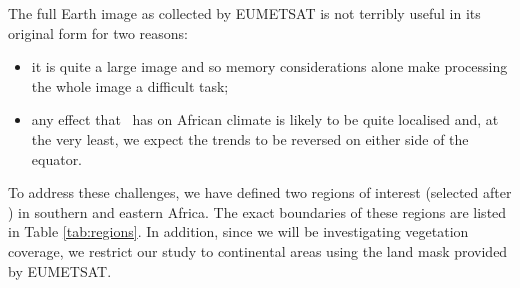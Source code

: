 \begin{table}
  \centering
  \caption{The coordinates that define our regions of interest. Top
    (Left) and Bottom (Right) correspond to the most northern
    (eastern) and southern (western) latitudes (longitudes) of the
    boxes defining the regions, respectively. All values in decimal
    degrees.}
  \label{tab:regions}
\end{table}

The full Earth image as collected by EUMETSAT is not terribly useful
in its original form for two reasons:
\begin{itemize}
  \item{it is quite a large
    image and so memory considerations alone make processing the whole
    image a difficult task;}
  \item{any effect that \elnino\ has on African climate is likely to be
    quite localised and, at the very least, we expect the trends to be
    reversed on either side of the equator.}
\end{itemize}
To address these challenges, we have defined two regions of interest
(selected after \cite{anyamba1996, anyamba2002}) in southern and
eastern Africa. The exact boundaries of these regions are listed in
Table \ref{tab:regions}. In addition, since we will be investigating
vegetation coverage, we restrict our study to continental areas using
the land mask provided by EUMETSAT.
